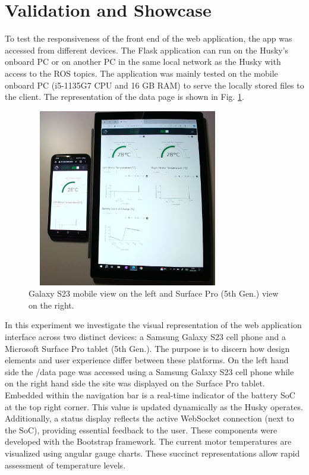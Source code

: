 \documentclass[conference]{IEEEtran}
\begin{document}
\section{Validation and Showcase}\label{VS}
To test the responsiveness of the front end of the web application, the app was accessed from different devices. The Flask application can run on the Husky's onboard PC or on another PC in the same local network as the Husky with access to the ROS topics. The application was mainly tested on the mobile onboard PC (i5-1135G7 CPU and 16 GB RAM) to serve the locally stored files to the client.
The representation of the data page is shown in Fig. \ref{fig:galaxysurface}. 
\begin{figure}[htbp]
    \centerline{\includegraphics[width=8.8cm, height=7.75cm]{Pictures/galaxysurfacecut.png}}
    \caption{Galaxy S23 mobile view on the left and Surface Pro (5th Gen.) view on the right.}
    \label{fig:galaxysurface}
\end{figure}
In this experiment we investigate the visual representation of the web application interface across two distinct devices: a Samsung Galaxy S23 cell phone and a Microsoft Surface Pro tablet (5th Gen.). The purpose is to discern how design elements and user experience differ between these platforms.
On the left hand side the /data page was accessed using a Samsung Galaxy S23 cell phone while on the right hand side the site was displayed on the Surface Pro tablet.
Embedded within the navigation bar is a real-time indicator of the battery SoC at the top right corner. This value is updated dynamically as the Husky operates.
Additionally, a status display reflects the active WebSocket connection (next to the SoC), providing essential feedback to the user.
These components were developed with the Bootstrap framework. The current motor temperatures are visualized using angular gauge charts. These succinct representations allow rapid assessment of temperature levels.
\end{document}
